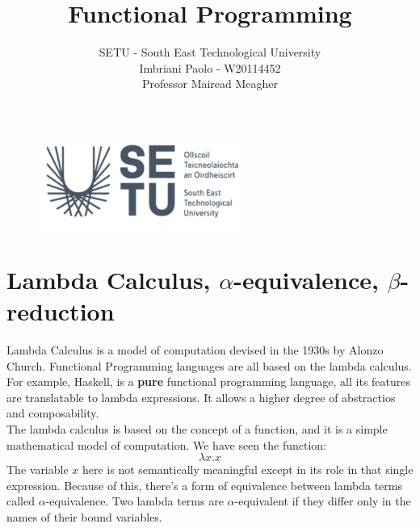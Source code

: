 \documentclass[a4paper]{article}
\title{Functional Programming}
\author{SETU - South East Technological University\\Imbriani Paolo - W20114452\\Professor Mairead Meagher}
\begin{document}
\begin{figure}
    \centering
    \includegraphics[width=0.6\textwidth]{SETU.png}
    \label{fig:centered-image}
\end{figure}

\maketitle 

\pagebreak

\tableofcontents

\pagebreak

\section{Lambda Calculus, $\alpha$-equivalence, $\beta$-reduction}

Lambda Calculus is a model of computation devised in the 1930s by Alonzo Church. Functional Programming 
languages are all based on the lambda calculus. For example, Haskell, is a \textbf{pure} functional programming language, all
its features are translatable to lambda expressions. It allows a higher degree of abstractios and composability.
\\
The lambda calculus is based on the concept of a function, and it is a simple mathematical model of computation. 
We have seen the function:
\[ \lambda x . x \]
The variable $x$ here is not semantically meaningful except in its role in that single expression. Because of this, there's a form 
of equivalence between lambda terms called $\alpha$-equivalence. Two lambda terms are $\alpha$-equivalent if they differ only in the names of their bound variables.
\end{document}
